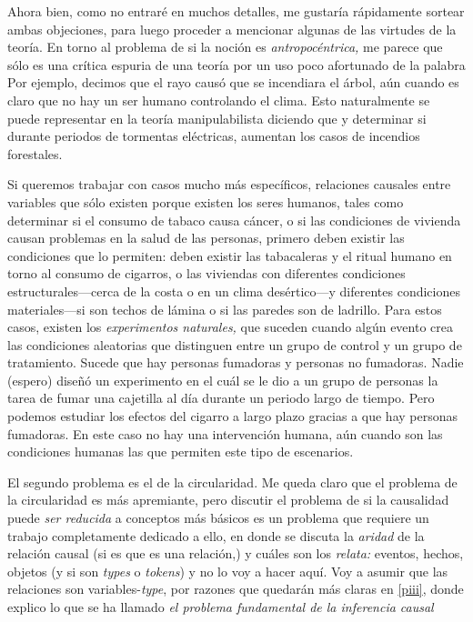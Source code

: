 Ahora bien, como no entraré en muchos detalles, me gustaría
rápidamente sortear ambas objeciones, para luego proceder a
mencionar algunas de las virtudes de la teoría. En torno al
problema de si la noción es \emph{antropocéntrica,} me
parece que sólo es una crítica espuria de una teoría por un
uso poco afortunado de la palabra  Por
ejemplo, decimos que el rayo causó que se incendiara el
árbol, aún cuando es claro que no hay un ser humano
controlando el clima. Esto naturalmente se puede representar
en la teoría manipulabilista diciendo que  y determinar si durante
periodos de tormentas eléctricas, aumentan los casos de
incendios forestales. 

Si queremos trabajar con casos mucho más específicos,
relaciones causales entre variables que sólo existen porque
existen los seres humanos, tales como determinar si el
consumo de tabaco causa cáncer, o si las condiciones de
vivienda causan problemas en la salud de las personas,
primero deben existir las condiciones que lo permiten: deben
existir las tabacaleras y el ritual humano en torno al
consumo de cigarros, o las viviendas con diferentes
condiciones estructurales---cerca de la costa o en un clima
desértico---y diferentes condiciones materiales---si son
techos de lámina o si las paredes son de ladrillo. Para
estos casos, existen los \emph{experimentos naturales,} que
suceden cuando algún evento crea las condiciones aleatorias
que distinguen entre un grupo de control y un grupo de
tratamiento. Sucede que hay personas fumadoras y personas no
fumadoras. Nadie (espero) diseñó un experimento en el cuál
se le dio a un grupo de personas la tarea de fumar una
cajetilla al día durante un periodo largo de tiempo. Pero
podemos estudiar los efectos del cigarro a largo plazo
gracias a que hay personas fumadoras. En este caso no hay
una intervención humana, aún cuando son las condiciones
humanas las que permiten este tipo de escenarios. 

El segundo problema es el de la circularidad. Me queda claro
que el problema de la circularidad es más apremiante, pero
discutir el problema de si la causalidad puede \emph{ser
reducida} a conceptos más básicos es un problema que
requiere un trabajo completamente dedicado a ello, en donde
se discuta la \emph{aridad} de la relación causal (si es que
es una relación,) y cuáles son los \emph{relata:} eventos,
hechos, objetos (y si son \emph{types} o \emph{tokens}) y no
lo voy a hacer aquí. Voy a asumir que las relaciones son
variables-\emph{type}, por razones que quedarán más claras
en \ref{piii}, donde explico lo que
se ha llamado \emph{el problema fundamental de la inferencia
causal}

